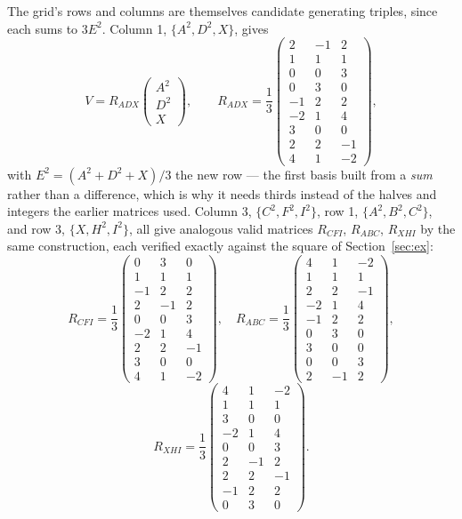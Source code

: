 \documentclass[12pt]{article}
\theoremstyle{remark}
\begin{document}
The grid's rows and columns are themselves candidate generating
triples, since each sums to $3E^2$. Column 1, $\{A^2, D^2, X\}$,
gives
\[
V = R_{ADX} \begin{pmatrix} A^2 \\ D^2 \\ X \end{pmatrix} , \qquad
R_{ADX} = \frac13
\begin{pmatrix}
2&-1&2\\ 1&1&1\\ 0&0&3\\ 0&3&0\\ -1&2&2\\ -2&1&4\\
3&0&0\\ 2&2&-1\\ 4&1&-2
\end{pmatrix} ,
\]
with $E^2 = (A^2+D^2+X)/3$ the new row --- the first basis built from
a \emph{sum} rather than a difference, which is why it needs thirds
instead of the halves and integers the earlier matrices used. Column
3, $\{C^2,F^2,I^2\}$, row 1, $\{A^2,B^2,C^2\}$, and row 3,
$\{X,H^2,I^2\}$, all give analogous valid matrices $R_{CFI}$,
$R_{ABC}$, $R_{XHI}$ by the same construction, each verified exactly
against the square of Section~\ref{sec:ex}:
\[
R_{CFI} = \frac13
\begin{pmatrix}
0&3&0\\ 1&1&1\\ -1&2&2\\ 2&-1&2\\ 0&0&3\\ -2&1&4\\
2&2&-1\\ 3&0&0\\ 4&1&-2
\end{pmatrix} , \quad
R_{ABC} = \frac13
\begin{pmatrix}
4&1&-2\\ 1&1&1\\ 2&2&-1\\ -2&1&4\\ -1&2&2\\ 0&3&0\\
3&0&0\\ 0&0&3\\ 2&-1&2
\end{pmatrix} ,
\]
\[
R_{XHI} = \frac13
\begin{pmatrix}
4&1&-2\\ 1&1&1\\ 3&0&0\\ -2&1&4\\ 0&0&3\\ 2&-1&2\\
2&2&-1\\ -1&2&2\\ 0&3&0
\end{pmatrix} .
\]
\end{document}
